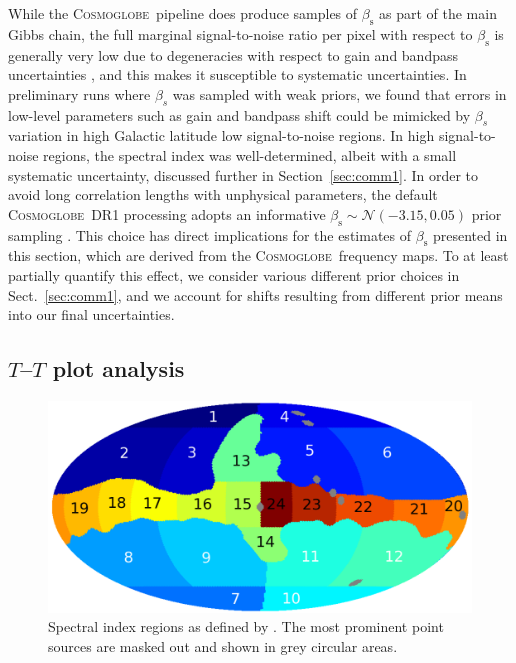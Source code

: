 \documentclass[twocolumn]{../../common/aa}
\def\commanderthree{\texttt{Commander3}}
\newcommand{\cosmoglobe}{\textsc{Cosmoglobe}}
\begin{document}
While the \cosmoglobe\ pipeline does produce samples of $\beta_{\mathrm{s}}$ as part of the main Gibbs chain, the full marginal signal-to-noise ratio per pixel with respect to $\beta_{\mathrm{s}}$ is generally very low due to degeneracies with respect to gain and bandpass uncertainties \citep{bp07,bp09}, and this makes it susceptible to systematic uncertainties. 
In preliminary runs where $\beta_s$ was sampled with weak priors, we found that errors in low-level parameters such as gain and bandpass shift could be mimicked by $\beta_s$ variation in high Galactic latitude low signal-to-noise regions. 
In high signal-to-noise regions, the spectral index was well-determined, albeit with a small systematic uncertainty, discussed further in Section~\ref{sec:comm1}.
In order to avoid long correlation lengths with unphysical parameters, the default \cosmoglobe\ DR1 processing adopts an informative $\beta_\mathrm s\sim\mathcal N(-3.15, 0.05)$ prior sampling \citep{watts2023_dr1}. This choice has direct implications for the estimates of $\beta_{\mathrm{s}}$ presented in this section, which are derived from the \cosmoglobe\ frequency maps. To at least partially quantify this effect, we consider various different prior choices in Sect.~\ref{sec:comm1}, and we account for shifts resulting from different prior means into our final uncertainties.




\subsection{$T$--$T$ plot analysis}
\label{sec:tt_plot}

\begin{figure}
        \centering
        \includegraphics[width=\linewidth]{figures/utnymaske_tall_converted.pdf}
	\caption{Spectral index regions as defined by \citet{fuskeland2014}. The most prominent point sources are masked out and shown in grey circular areas.         }
        \label{fig:regions}
\end{figure}
\end{document}
